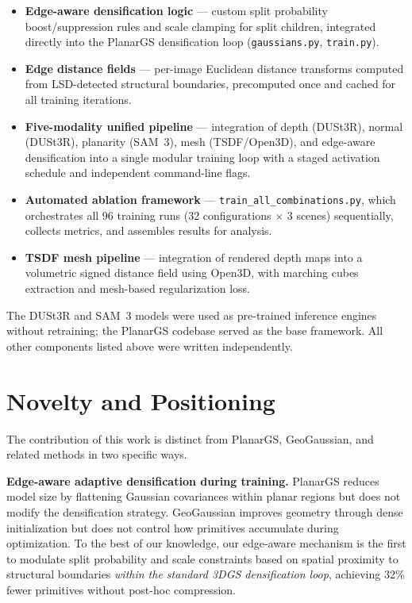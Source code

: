 \begin{itemize}
    \item \textbf{Edge-aware densification logic} — custom split probability boost/suppression rules and scale clamping for split children, integrated directly into the PlanarGS densification loop (\texttt{gaussians.py}, \texttt{train.py}).
    \item \textbf{Edge distance fields} — per-image Euclidean distance transforms computed from LSD-detected structural boundaries, precomputed once and cached for all training iterations.
    \item \textbf{Five-modality unified pipeline} — integration of depth (DUSt3R), normal (DUSt3R), planarity (SAM~3), mesh (TSDF/Open3D), and edge-aware densification into a single modular training loop with a staged activation schedule and independent command-line flags.
    \item \textbf{Automated ablation framework} — \texttt{train\_all\_combinations.py}, which orchestrates all 96 training runs (32 configurations $\times$ 3 scenes) sequentially, collects metrics, and assembles results for analysis.
    \item \textbf{TSDF mesh pipeline} — integration of rendered depth maps into a volumetric signed distance field using Open3D, with marching cubes extraction and mesh-based regularization loss.
\end{itemize}

The DUSt3R and SAM~3 models were used as pre-trained inference engines without retraining; the PlanarGS codebase served as the base framework. All other components listed above were written independently.

\section{Novelty and Positioning}

The contribution of this work is distinct from PlanarGS, GeoGaussian, and related methods in two specific ways.

\textbf{Edge-aware adaptive densification during training.} PlanarGS reduces model size by flattening Gaussian covariances within planar regions but does not modify the densification strategy. GeoGaussian improves geometry through dense initialization but does not control how primitives accumulate during optimization. To the best of our knowledge, our edge-aware mechanism is the first to modulate split probability and scale constraints based on spatial proximity to structural boundaries \emph{within the standard 3DGS densification loop}, achieving 32\% fewer primitives without post-hoc compression.

